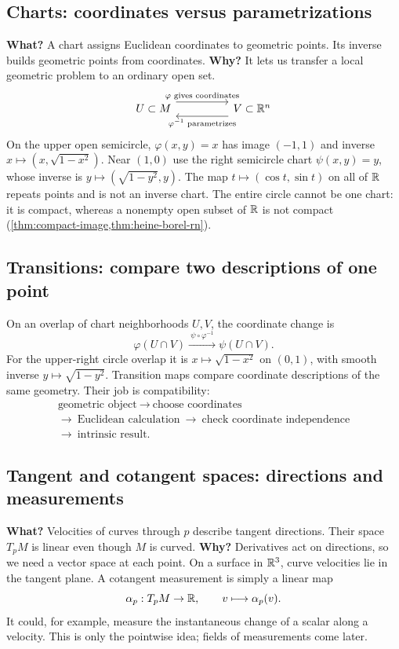 \subsection*{Charts: coordinates versus parametrizations}
\textbf{What?} A chart assigns Euclidean coordinates to geometric points.
Its inverse builds geometric points from coordinates. \textbf{Why?} It
lets us transfer a local geometric problem to an ordinary open set.
\[
\begin{tikzcd}[column sep=huge]
U\subset M\arrow[r,shift left=1.5ex,"\varphi\text{ gives coordinates}"]&
V\subset\R^n\arrow[l,shift left=1.5ex,"\varphi^{-1}\text{ parametrizes}"]
\end{tikzcd}
\]
On the upper open semicircle, $\varphi(x,y)=x$ has image $(-1,1)$ and
inverse $x\mapsto(x,\sqrt{1-x^2})$. Near $(1,0)$ use the right semicircle
chart $\psi(x,y)=y$, whose inverse is $y\mapsto(\sqrt{1-y^2},y)$.
The map $t\mapsto(\cos t,\sin t)$ on all of $\mathbb{R}$ repeats points and is
not an inverse chart. The entire circle cannot be one chart: it is compact,
whereas a nonempty open subset of $\mathbb{R}$ is not compact
(\cref{thm:compact-image,thm:heine-borel-rn}).


\subsection*{Transitions: compare two descriptions of one point}
On an overlap of chart neighborhoods $U,V$, the coordinate change is
\[
\varphi(U\cap V)\xrightarrow{\ \psi\circ\varphi^{-1}\ }
\psi(U\cap V).
\]
For the upper-right circle overlap it is $x\mapsto\sqrt{1-x^2}$ on $(0,1)$,
with smooth inverse $y\mapsto\sqrt{1-y^2}$. Transition maps compare
coordinate descriptions of the same geometry. Their job is compatibility:
\[
\boxed{\begin{gathered}
\text{geometric object}\ \longrightarrow\ \text{choose coordinates}\\
\longrightarrow\ \text{Euclidean calculation}\
\longrightarrow\ \text{check coordinate independence}\\
\longrightarrow\ \text{intrinsic result}.
\end{gathered}}
\]

\subsection*{Tangent and cotangent spaces: directions and measurements}
\textbf{What?} Velocities of curves through $p$ describe tangent directions.
Their space $T_pM$ is linear even though $M$ is curved. \textbf{Why?}
Derivatives act on directions, so we need a vector space at each point.
On a surface in $\mathbb{R}^3$, curve velocities lie in the tangent plane.
A cotangent measurement is simply a linear map
\[
\alpha_p:T_pM\to\mathbb{R},\qquad v\longmapsto\alpha_p(v).
\]
It could, for example, measure the instantaneous change of a scalar along
a velocity. This is only the pointwise idea; fields of measurements come later.


